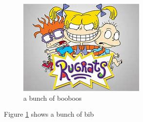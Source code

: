 \documentclass{article}
\begin{document}
   \begin{figure}
	\centering
	\includegraphics[width=0.7\linewidth]{screenshot002}
	\caption{a bunch of booboos}
	\label{fig:screenshot002}
   \end{figure}
   Figure \ref{fig:screenshot002} shows a bunch of bib
   
\end{document}
